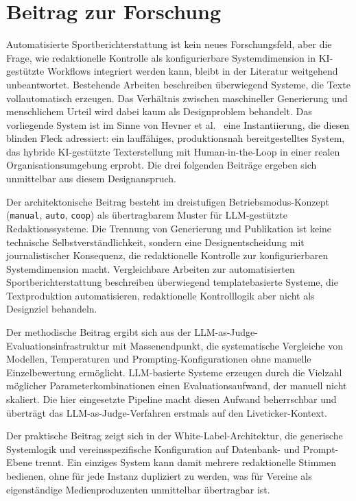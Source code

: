 \section{Beitrag zur Forschung}\label{beitrag-zur-forschung}

Automatisierte Sportberichterstattung ist kein neues Forschungsfeld, aber die Frage, wie redaktionelle Kontrolle als konfigurierbare Systemdimension in KI-gestützte Workflows integriert werden kann, bleibt in der Literatur weitgehend unbeantwortet. Bestehende Arbeiten beschreiben überwiegend Systeme, die Texte vollautomatisch erzeugen. Das Verhältnis zwischen maschineller Generierung und menschlichem Urteil wird dabei kaum als Designproblem behandelt. Das vorliegende System ist im Sinne von Hevner et al.~\cite{hevner2004} eine Instantiierung, die diesen blinden Fleck adressiert: ein lauffähiges, produktionsnah bereitgestelltes System, das hybride KI-gestützte Texterstellung mit Human-in-the-Loop in einer realen Organisationsumgebung erprobt. Die drei folgenden Beiträge ergeben sich unmittelbar aus diesem Designanspruch.

Der architektonische Beitrag besteht im dreistufigen Betriebsmodus-Konzept (\texttt{manual}, \texttt{auto}, \texttt{coop}) als übertragbarem Muster für LLM-gestützte Redaktionssysteme. Die Trennung von Generierung und Publikation ist keine technische Selbstverständlichkeit, sondern eine Designentscheidung mit journalistischer Konsequenz, die redaktionelle Kontrolle zur konfigurierbaren Systemdimension macht. Vergleichbare Arbeiten zur automatisierten Sportberichterstattung beschreiben überwiegend templatebasierte Systeme, die Textproduktion automatisieren, redaktionelle Kontrolllogik aber nicht als Designziel behandeln.

Der methodische Beitrag ergibt sich aus der LLM-as-Judge-Evaluationsinfrastruktur mit Massenendpunkt, die systematische Vergleiche von Modellen, Temperaturen und Prompting-Konfigurationen ohne manuelle Einzelbewertung ermöglicht. LLM-basierte Systeme erzeugen durch die Vielzahl möglicher Parameterkombinationen einen Evaluationsaufwand, der manuell nicht skaliert. Die hier eingesetzte Pipeline macht diesen Aufwand beherrschbar und überträgt das LLM-as-Judge-Verfahren \cite{zheng2023} erstmals auf den Liveticker-Kontext.

Der praktische Beitrag zeigt sich in der White-Label-Architektur, die generische Systemlogik und vereinsspezifische Konfiguration auf Datenbank- und Prompt-Ebene trennt. Ein einziges System kann damit mehrere redaktionelle Stimmen bedienen, ohne für jede Instanz dupliziert zu werden, was für Vereine als eigenständige Medienproduzenten unmittelbar übertragbar ist.


